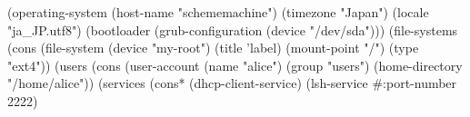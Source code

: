 \documentclass{beamer}
\begin{document}

\begin{frame}[fragile]
  \begin{semiverbatim}
    \small{
(\alert{operating-system}
  (host-name "schememachine")
  (timezone "Japan")
  (locale "ja_JP.utf8")
  (bootloader (grub-configuration (device "/dev/sda")))
  (file-systems (cons (\alert{file-system}
                        (device "my-root")
                        (title 'label)
                        (mount-point "/")
                        (type "ext4"))
  (users (cons (\alert{user-account}
                 (name "alice")
                 (group "users")
                 (home-directory "/home/alice"))
  (services (cons* (dhcp-client-service)
                   (lsh-service #:port-number 2222)
    }
  \end{semiverbatim}
\end{frame}
\end{document}
